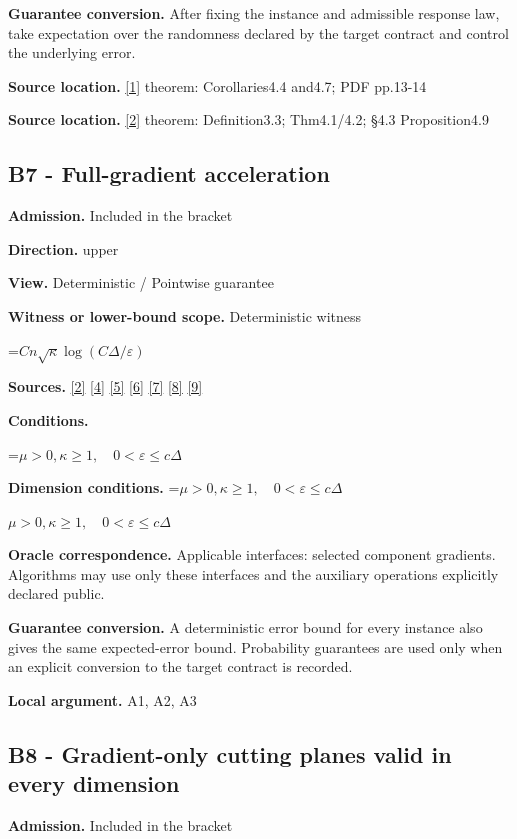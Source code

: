 \documentclass[10pt,a4paper]{article}
\newcommand{\AtlasMath}[1]{\par\begingroup\centering\setbox0=\hbox{$\displaystyle #1$}\ifdim\wd0>1.4\linewidth\typeout{ATLAS WIDE FORMULA: \the\wd0}\fi\ifdim\wd0>\linewidth\resizebox{\linewidth}{!}{\box0}\else\box0\fi\par\endgroup}
\newcommand{\AtlasInlineMath}[1]{\begingroup\setbox0=\hbox{$#1$}\ifdim\wd0>.4\linewidth\endgroup\AtlasMath{#1}\else\endgroup$#1$\fi}
\begin{document}
\textbf{Guarantee conversion.} After fixing the instance and admissible response law, take expectation over the randomness declared by the target contract and control the underlying error.

\textbf{Source location.} \href{https://arxiv.org/pdf/1802.03866}{[1]} theorem: Corollaries4.4 and4.7; PDF pp.13-14

\textbf{Source location.} \href{https://proceedings.mlr.press/v97/zhou19b/zhou19b.pdf}{[2]} theorem: Definition3.3; Thm4.1/4.2; §4.3 Proposition4.9

\subsection{B7 - Full-gradient acceleration}
\textbf{Admission.} Included in the bracket

\textbf{Direction.} upper

\textbf{View.} Deterministic / Pointwise guarantee

\textbf{Witness or lower-bound scope.} Deterministic witness

\AtlasMath{Cn\sqrt\kappa\log(C\Delta/\varepsilon)}
\textbf{Sources.} \href{https://proceedings.mlr.press/v97/zhou19b/zhou19b.pdf}{[2]} \href{https://arxiv.org/pdf/1405.4980}{[4]} \href{https://arxiv.org/pdf/2101.09740v2}{[5]} \href{https://arxiv.org/pdf/2609.33360v2}{[6]} \href{https://arxiv.org/pdf/2609.10874}{[7]} \href{https://www2.isye.gatech.edu/~nemirovs/MOR_AccuracyCertificates.pdf}{[8]} \href{https://arxiv.org/pdf/2609.20701}{[9]}

\textbf{Conditions.} 
\AtlasMath{\mu>0,\kappa\ge1,\quad0<\varepsilon\le c\Delta}


\textbf{Dimension conditions.} \AtlasInlineMath{\mu>0,\kappa\ge1,\quad0<\varepsilon\le c\Delta}

\textbf{Oracle correspondence.} Applicable interfaces: selected component gradients. Algorithms may use only these interfaces and the auxiliary operations explicitly declared public.

\textbf{Guarantee conversion.} A deterministic error bound for every instance also gives the same expected-error bound. Probability guarantees are used only when an explicit conversion to the target contract is recorded.

\textbf{Local argument.} A1, A2, A3

\subsection{B8 - Gradient-only cutting planes valid in every dimension}
\textbf{Admission.} Included in the bracket
\end{document}
